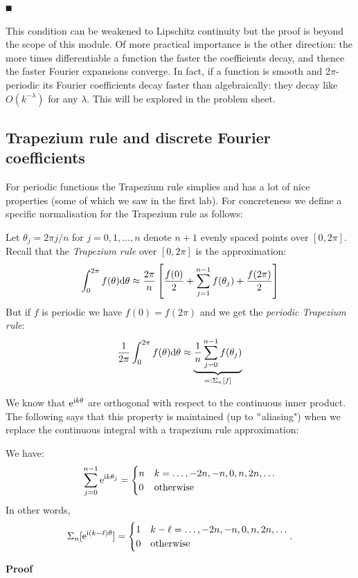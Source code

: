 \ensuremath{\QED}

This condition can be weakened to Lipschitz continuity but the proof is  beyond the scope of this module. Of more practical importance is the other direction: the more times differentiable a function the faster the coefficients decay, and thence the faster Fourier expansions converge. In fact, if a function is smooth and 2\ensuremath{\pi}-periodic its Fourier coefficients decay faster than algebraically: they decay like $O(k^{-\ensuremath{\lambda}})$ for any $\ensuremath{\lambda}$. This will be explored in the problem sheet.

\subsection{Trapezium rule and discrete Fourier coefficients}
For periodic functions the Trapezium rule simplies and has a lot of nice properties (some of which we saw in the first lab). For concreteness we define a specific normalisation for the Trapezium rule as follows:

\begin{definition} Let $\ensuremath{\theta}_j = 2\ensuremath{\pi}j/n$ for $j = 0,1,\ensuremath{\ldots},n$ denote $n+1$ evenly spaced points over $[0,2\ensuremath{\pi}]$. Recall that the \emph{Trapezium rule} over $[0,2\ensuremath{\pi}]$ is the approximation:
\[
\ensuremath{\int}_0^{2\ensuremath{\pi}} f(\ensuremath{\theta}) {\rm d}\ensuremath{\theta} \ensuremath{\approx} {2 \ensuremath{\pi} \over n} \left[{f(0) \over 2} + \ensuremath{\sum}_{j=1}^{n-1} f(\ensuremath{\theta}_j) + {f(2 \ensuremath{\pi}) \over 2} \right]
\]
But if $f$ is periodic we have $f(0) = f(2\ensuremath{\pi})$ and we get the \emph{periodic Trapezium rule}:
\[
{1 \over 2\ensuremath{\pi}} \ensuremath{\int}_0^{2\ensuremath{\pi}} f(\ensuremath{\theta}) {\rm d}\ensuremath{\theta} \ensuremath{\approx} \underbrace{{1 \over n} \ensuremath{\sum}_{j=0}^{n-1} f(\ensuremath{\theta}_j)}_{=:\ensuremath{\Sigma}_n[f]}
\]
\end{definition}

We know that ${\rm e}^{{\rm i} k \theta}$ are orthogonal with respect to the continuous inner product. The following says that this property is maintained (up to \ensuremath{\ldq}aliasing") when we replace the continuous integral with a trapezium rule approximation:

\begin{lemma} We have:
\[
\sum_{j=0}^{n-1} {\rm e}^{{\rm i} k \theta_j} =
\begin{cases} n & k = \ldots,-2n,-n,0,n,2n,\ldots  \cr
              0 & \hbox{otherwise}
\end{cases}
\]
In other words,
\[
\Sigma_n[{\rm e}^{{\rm i} (k-\ell) \theta}] =
\begin{cases} 1 & k-\ell = \ldots,-2n,-n,0,n,2n,\ldots  \cr
              0 & \hbox{otherwise}
\end{cases}.
\]
\end{lemma}
\textbf{Proof}

